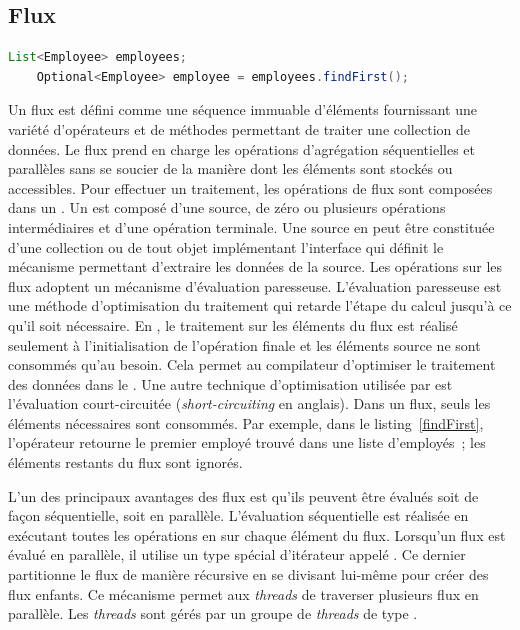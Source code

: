 
\subsection{Flux}


\begin{Listing}[tbp]
\begin{lstlisting}[language=java]
	List<Employee> employees;
	Optional<Employee> employee = employees.findFirst();
\end{lstlisting}
\caption{Optimisation du traitement d'un flux en utilisant la technique d'\'evaluation court-circuit\'ee.}
\label{findFirst}
\end{Listing}

Un flux est d\'efini comme une s\'equence immuable d'\'el\'ements fournissant une vari\'et\'e d'op\'erateurs et de m\'ethodes permettant de traiter une collection de donn\'ees. Le flux prend en charge les op\'erations d'agr\'egation \citep{javaStreamAggregate} s\'equentielles et parall\`eles sans se soucier de la mani\`ere dont les \'el\'ements sont stock\'es ou accessibles. Pour effectuer un traitement, les op\'erations de flux sont compos\'ees dans un . Un  est compos\'e d'une source, de z\'ero ou plusieurs op\'erations interm\'ediaires et d'une op\'eration terminale. Une source en peut \^etre constitu\'ee d'une collection ou de tout objet impl\'ementant l'interface qui d\'efinit le m\'ecanisme permettant d'extraire les donn\'ees de la source. 
Les op\'erations sur les flux adoptent un m\'ecanisme d'\'evaluation paresseuse. L'\'evaluation paresseuse est une m\'ethode d'optimisation du traitement qui retarde l'\'etape du calcul jusqu'\`a ce qu'il soit nécessaire. En , le traitement sur les \'el\'ements du flux est r\'ealis\'e seulement \`a l'initialisation de l'op\'eration finale et les \'el\'ements source ne sont consomm\'es qu'au besoin. Cela permet au compilateur d'optimiser le traitement des donn\'ees dans le .
Une autre technique d'optimisation utilis\'ee par  est l'\'evaluation court-circuit\'ee (\emph{short-circuiting} en anglais). Dans un flux, seuls les \'el\'ements n\'ecessaires sont consomm\'es. Par exemple, dans le listing~\ref{findFirst}, l'opérateur  retourne le premier employ\'e trouv\'e dans une liste d'employ\'es~; les \'el\'ements restants du flux sont ignor\'es.


L'un des principaux avantages des flux est qu'ils peuvent \^etre \'evalu\'es soit de fa\c{c}on s\'equentielle, soit en parall\`ele. L'\'evaluation s\'equentielle est r\'ealis\'ee en ex\'ecutant toutes les op\'erations en  sur chaque \'el\'ement du flux. Lorsqu'un flux est \'evalu\'e en parall\`ele, il utilise un type sp\'ecial d'it\'erateur appel\'e . Ce dernier partitionne le flux de mani\`ere r\'ecursive en se divisant lui-m\^eme pour cr\'eer des flux enfants. Ce m\'ecanisme permet aux \emph{threads} de traverser plusieurs flux en parall\`ele. Les \emph{threads} sont g\'er\'es par un groupe de \emph{threads} de type .


